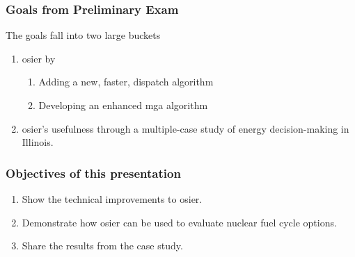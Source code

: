 \begin{frame}
    \frametitle{Goals from Preliminary Exam}

    The goals fall into two large buckets

    \begin{enumerate}
        \item {} \gls{osier} by
        \begin{enumerate}
            \item Adding a new, faster, dispatch algorithm
            \item Developing an enhanced \gls{mga} algorithm
        \end{enumerate}
        \item {} \gls{osier}'s usefulness through a 
        multiple-case study of energy decision-making in Illinois.
    \end{enumerate}
\end{frame}

\begin{frame}
    \frametitle{Objectives of this presentation}
    \begin{enumerate}
        \item Show the technical improvements to \gls{osier}.
        \item Demonstrate how \gls{osier} can be used to evaluate nuclear fuel cycle options.
        \item Share the results from the case study.
    \end{enumerate}
\end{frame}